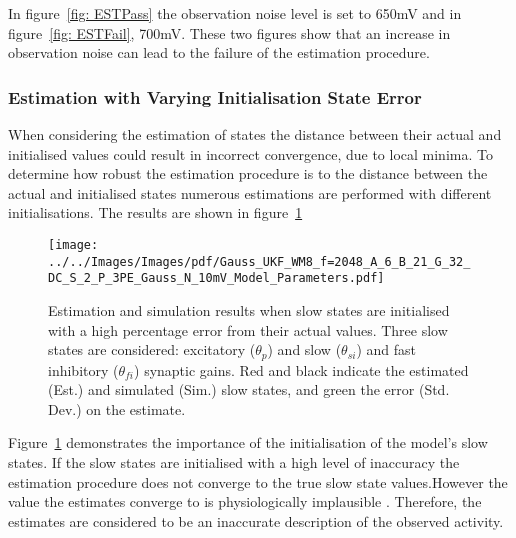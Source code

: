 
In figure~\ref{fig: ESTPass} the observation noise level is set to 650mV and in figure~\ref{fig: ESTFail}, 700mV. These two figures show that an increase in observation noise can lead to the failure of the estimation procedure.

\subsubsection{Estimation with Varying Initialisation State Error}

When considering the estimation of states the distance between their actual and initialised values could result in incorrect convergence, due to local minima. To determine how robust the estimation procedure is to the distance between the actual and initialised states numerous estimations are performed with different initialisations. The results are shown in figure~\ref{fig: EstInitFail}
\begin{figure}%
	\centering
		\texttt{[image: ../../Images/Images/pdf/Gauss\_UKF\_WM8\_f=2048\_A\_6\_B\_21\_G\_32\_DC\_S\_2\_P\_3PE\_Gauss\_N\_10mV\_Model\_Parameters.pdf]}
	\caption{Estimation and simulation results when slow states are initialised with a high percentage error from their actual values. Three slow states are considered: excitatory ($\theta_{p}$) and slow ($\theta_{si}$) and fast inhibitory ($\theta_{fi}$) synaptic gains. Red and black indicate the estimated (Est.) and simulated (Sim.) slow states, and green the error (Std. Dev.) on the estimate.}
	\label{fig: EstInitFail}
\end{figure}%


Figure~\ref{fig: EstInitFail} demonstrates the importance of the initialisation of the model's slow states. If the slow states are initialised with a high level of inaccuracy the estimation procedure does not converge to the true slow state values.However the value the estimates converge to is physiologically implausible . Therefore, the estimates are considered to be an inaccurate description of the observed activity.

